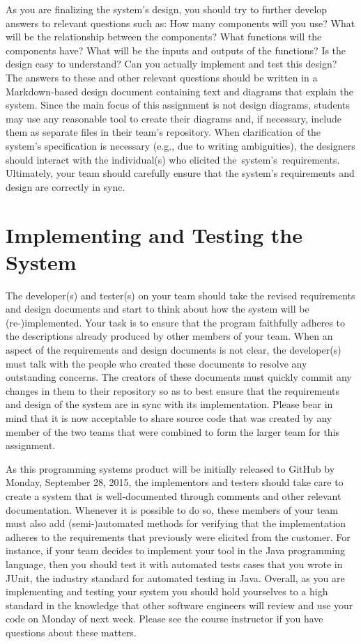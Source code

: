 As you are finalizing the system's design, you should try to further develop answers to relevant questions such as: How
many components will you use? What will be the relationship between the components? What functions will the components
have?  What will be the inputs and outputs of the functions?  Is the design easy to understand?  Can you actually
implement and test this design? The answers to these and other relevant questions should be written in a Markdown-based
design document containing text and diagrams that explain the system. Since the main focus of this assignment is not
design diagrams, students may use any reasonable tool to create their diagrams and, if necessary, include them as
separate files in their team's repository.  When clarification of the system's specification is necessary (e.g., due to
writing ambiguities), the designers should interact with the individual(s) who elicited \mbox{the system's
requirements}.  Ultimately, your team should carefully ensure that the system's requirements and design are correctly in
sync.

\vspace*{-.05in}
\section*{Implementing and Testing the System}

The developer(s) and tester(s) on your team should take the revised requirements and design documents and start to think
about how the system will be (re-)implemented. Your task is to ensure that the program faithfully adheres to the descriptions
already produced by other members of your team. When an aspect of the requirements and design documents is not clear,
the developer(s) must talk with the people who created these documents to resolve any outstanding concerns. The creators
of these documents must quickly commit any changes in them to their repository so as to best ensure that the
requirements and design of the system are in sync with its implementation. Please bear in mind that it is now acceptable
to share source code that was created by any member of the two teams that were combined to form the larger team for this
assignment.

As this programming systems product will be initially released to GitHub by Monday, September 28, 2015, the implementors
and testers should take care to create a system that is well-documented through comments and other relevant
documentation. Whenever it is possible to do so, these members of your team must also add (semi-)automated methods for
verifying that the implementation adheres to the requirements that previously were elicited from the customer. For
instance, if your team decides to implement your tool in the Java programming language, then you should test it
with automated tests cases that you wrote in JUnit, the industry standard for automated testing in Java. Overall, as you
are implementing and testing your system you should hold yourselves to a high standard in the knowledge that other
software engineers will review and use your code on Monday of next week. Please see the course instructor if you have
questions about these matters.

